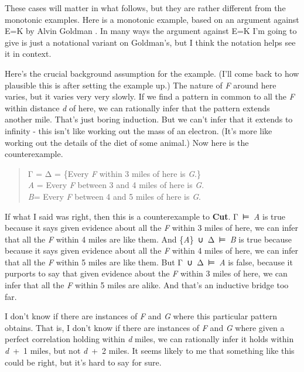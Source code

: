 \documentclass[
  11pt,
]{book}
\begin{document}
These cases will matter in what follows, but they are rather different from the monotonic examples. Here is a monotonic example, based on an argument against E=K by Alvin Goldman \citeyearpar{Goldman2009}. In many ways the argument against E=K I'm going to give is just a notational variant on Goldman's, but I think the notation helps see it in context.

Here's the crucial background assumption for the example. (I'll come back to how plausible this is after setting the example up.) The nature of \emph{F} around here varies, but it varies very very slowly. If we find a pattern in common to all the \emph{F} within distance \emph{d} of here, we can rationally infer that the pattern extends another mile. That's just boring induction. But we can't infer that it extends to infinity - this isn't like working out the mass of an electron. (It's more like working out the details of the diet of some animal.) Now here is the counterexample.

\begin{quote}
Γ = Δ = \{Every \emph{F} within 3 miles of here is \emph{G}.\}\\
\emph{A} = Every \emph{F} between 3 and 4 miles of here is \emph{G}.\\
\emph{B}= Every \emph{F} between 4 and 5 miles of here is \emph{G}.
\end{quote}

If what I said was right, then this is a counterexample to \textbf{Cut}. Γ~⊨~\emph{A} is true because it says given evidence about all the \emph{F} within 3 miles of here, we can infer that all the \emph{F} within 4 miles are like them. And \{\emph{A}\}~∪~Δ~⊨~\emph{B} is true because because it says given evidence about all the \emph{F} within 4 miles of here, we can infer that all the \emph{F} within 5 miles are like them. But Γ~∪~Δ~⊨~\emph{A} is false, because it purports to say that given evidence about the \emph{F} within 3 miles of here, we can infer that all the \emph{F} within 5 miles are alike. And that's an inductive bridge too far.

I don't know if there are instances of \emph{F} and \emph{G} where this particular pattern obtains. That is, I don't know if there are instances of \emph{F} and \emph{G} where given a perfect correlation holding within \emph{d} miles, we can rationally infer it holds within \emph{d}~+~1 miles, but not \emph{d}~+~2 miles. It seems likely to me that something like this could be right, but it's hard to say for sure.
\end{document}
